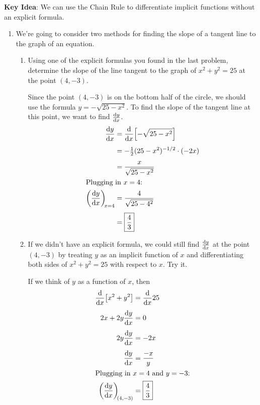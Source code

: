 \documentclass[main]{subfiles}
\begin{document}
\pspace{\newpage}

\textbf{Key Idea}: We can use the Chain Rule to differentiate implicit functions without an explicit formula.

\begin{enumerate}[resume]
\item We're going to consider two methods for finding the slope of a tangent line to the graph of an equation. 
\begin{enumerate}
\item
\begin{problem}
Using one of the explicit formulas you found in the last problem, determine the slope of the line tangent to the graph of $x^2+y^2=25$ at the point $(4, -3)$.
\end{problem}
\pspace{\vfill}

\begin{solution}
    Since the point $(4, -3)$ is on the bottom half of the circle, we should use the formula $y=-\sqrt{25-x^2}$. To find the slope of the tangent line at this point, we want to find $\diff{y}{x}$.
    \begin{align*}
        \diff{y}{x} &= \diff*{\!\left[-\sqrt{25-x^2}\right]}{x} \\[4pt]
        &= -\tfrac{1}{2}(25-x^2)^{-1/2} \cdot (-2x) \\[4pt]
        &= \frac{x}{\sqrt{25-x^2}} \\
        \intertext{Plugging in $x=4$:}
        \diff{y}{x}[x=4] &= \frac{4}{\sqrt{25-4^2}} \\[4pt]
        &= \fbox{$\dfrac{4}{3}$}
    \end{align*}
\end{solution}

\item 
\begin{problem}
If we didn't have an explicit formula, we could still find $\diff{y}{x}$ at the point $(4,-3)$ by treating $y$ as an implicit function of $x$ and differentiating both sides of $x^2+y^2=25$ with respect to $x$. Try it.
\end{problem}
\pspace{\vfill}

\begin{solution}
    If we think of $y$ as a function of $x$, then
    \begin{align*}
        \diff*{\!\left[x^2+y^2\right]}{x} &= \diff*{25}{x} \\[4pt]
        2x + 2y\diff{y}{x} &= 0 \\[4pt]
        2y\diff{y}{x} &= -2x \\[4pt]
        \diff{y}{x} &= \frac{-x}{y}\\
        \intertext{Plugging in $x=4$ and $y=-3$:}
        \diff{y}{x}[(4,-3)] &= \fbox{$\dfrac{4}{3}$}
    \end{align*}
\end{solution}


\end{enumerate}
\end{enumerate}
\end{document}
